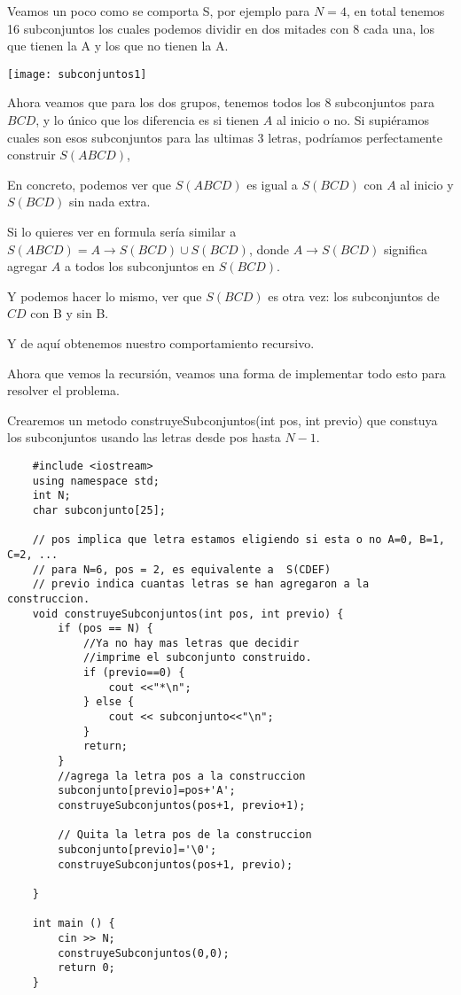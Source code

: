 Veamos un poco como se comporta S, por ejemplo para \(N = 4\), en total tenemos 16 subconjuntos los cuales podemos dividir en dos mitades con 8 cada una, los que tienen la A y los que no tienen la A.



\begin{center}
	\texttt{[image: subconjuntos1]}
\end{center}

Ahora veamos que para los dos grupos, tenemos todos los 8 subconjuntos para \(BCD\), y lo único que los diferencia es si tienen \(A\) al inicio o no. Si supiéramos cuales son esos subconjuntos para las ultimas 3 letras, podríamos perfectamente construir \(S(ABCD)\), 

En concreto, podemos ver que \(S(ABCD) \) es igual a \(S(BCD)\) con \(A\) al inicio y \(S(BCD)\) sin nada extra. 

Si lo quieres ver en formula sería similar a \(S(ABCD)=A\rightarrow S(BCD) \cup S(BCD)\), donde \(A\rightarrow S(BCD)\) significa agregar \(A\) a todos los subconjuntos en \(S(BCD)\).

Y podemos hacer lo mismo, ver que \(S(BCD)\) es otra vez: los subconjuntos de \(CD\) con B y sin B.

Y de aquí obtenemos nuestro comportamiento recursivo.

Ahora que vemos la recursión, veamos una forma de implementar todo esto para resolver el problema.

Crearemos un metodo construyeSubconjuntos(int pos, int previo) que constuya los subconjuntos usando las letras desde pos hasta \(N-1\).
\pagebreak
\begin{lstlisting}
	#include <iostream>
	using namespace std;
	int N;
	char subconjunto[25];
	
	// pos implica que letra estamos eligiendo si esta o no A=0, B=1, C=2, ...
	// para N=6, pos = 2, es equivalente a  S(CDEF)
	// previo indica cuantas letras se han agregaron a la construccion.
	void construyeSubconjuntos(int pos, int previo) {
		if (pos == N) {
			//Ya no hay mas letras que decidir
			//imprime el subconjunto construido.
			if (previo==0) {
				cout <<"*\n";
			} else {
				cout << subconjunto<<"\n"; 
			}
			return;
		}
		//agrega la letra pos a la construccion
		subconjunto[previo]=pos+'A'; 
		construyeSubconjuntos(pos+1, previo+1); 
		
		// Quita la letra pos de la construccion
		subconjunto[previo]='\0'; 
		construyeSubconjuntos(pos+1, previo); 
		
	}
	
	int main () {
		cin >> N;
		construyeSubconjuntos(0,0);
		return 0;
	}
\end{lstlisting}


